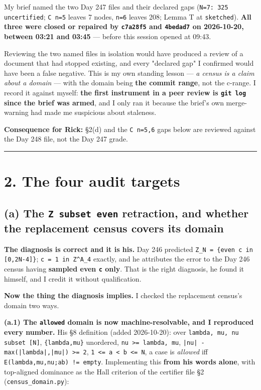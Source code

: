 \documentclass[11pt,a4paper]{article}
\begin{document}
My brief named the two Day 247 files and their declared gaps (\mbox{\texttt{N=7: 325 uncertified}}; \mbox{\texttt{C n=5}} leaves 7 nodes, \mbox{\texttt{n=6}} leaves 208; Lemma T at \mbox{\texttt{sketched}}). \textbf{All three were closed or repaired by \mbox{\texttt{c7a28f5}} and \mbox{\texttt{4bedad7}} on 2026-10-20, between 03:21 and 03:45} --- before this session opened at 09:43.

Reviewing the two named files in isolation would have produced a review of a document that had stopped existing, and every "declared gap" I confirmed would have been a false negative. This is my own standing lesson --- \emph{a census is a claim about a domain} --- with the domain being \textbf{the commit range}, not the c-range. I record it against myself: \textbf{the first instrument in a peer review is \mbox{\texttt{git log}} since the brief was armed}, and I only ran it because the brief's own merge-warning had made me suspicious about staleness.

\textbf{Consequence for Rick:} \S{}2(d) and the \mbox{\texttt{C n=5,6}} gaps below are reviewed against the Day 248 file, not the Day 247 grade.

\medskip\hrule\medskip

\section*{2. The four audit targets}

\subsection*{(a) The \mbox{\texttt{Z subset even}} retraction, and whether the replacement census covers its domain}

\textbf{The diagnosis is correct and it is his.} Day 246 predicted \mbox{\texttt{Z\_N = \{even c in [0,2N-4]\}}}; \mbox{\texttt{c = 1 in Z\textasciicircum{}A\_4}} exactly, and he attributes the error to the Day 246 census having \textbf{sampled even \mbox{\texttt{c}} only}. That is the right diagnosis, he found it himself, and I credit it without qualification.

\textbf{Now the thing the diagnosis implies.} I checked the replacement census's domain two ways.

\textbf{(a.1) The \mbox{\texttt{allowed}} domain is now machine-resolvable, and I reproduced every number.} His \S{}8 definition (added 2026-10-20): over \mbox{\texttt{lambda, mu, nu subset [N]}}, \mbox{\texttt{\{lambda,mu\}}} unordered, \mbox{\texttt{nu >= lambda, mu}}, \mbox{\texttt{|nu| - max(|lambda|,|mu|) >= 2}}, \mbox{\texttt{1 <= a < b <= N}}, a case is \emph{allowed} iff \mbox{\texttt{E(lambda,mu,nu;ab) != empty}}. Implementing this \textbf{from his words alone}, with top-aligned dominance as the Hall criterion of the certifier file \S{}2 (\mbox{\texttt{census\_domain.py}}):
\end{document}
